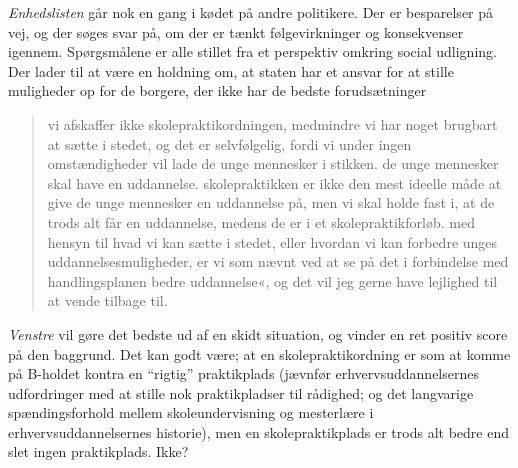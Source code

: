 \textit{Enhedslisten} går nok en gang i kødet på andre politikere.
Der er besparelser på vej, og der søges svar på, om der er tænkt følgevirkninger og konsekvenser igennem.
Spørgsmålene er alle stillet fra et perspektiv omkring social udligning.
Der lader til at være en holdning om, at staten har et ansvar for at stille muligheder op for de borgere, der ikke har de bedste forudsætninger

\begin{quotation}
vi afskaffer ikke skolepraktikordningen, medmindre vi har noget brugbart at sætte i stedet, og det er selvfølgelig, fordi vi under ingen omstændigheder vil lade de unge mennesker i stikken. de unge mennesker skal have en uddannelse. skolepraktikken er ikke den mest ideelle måde at give de unge mennesker en uddannelse på, men vi skal holde fast i, at de trods alt får en uddannelse, medens de er i et skolepraktikforløb. med hensyn til hvad vi kan sætte i stedet, eller hvordan vi kan forbedre unges uddannelsesmuligheder, er vi som nævnt ved at se på det i forbindelse med handlingsplanen bedre uddannelse«, og det vil jeg gerne have lejlighed til at vende tilbage til.
\end{quotation}

\textit{Venstre} vil gøre det bedste ud af en skidt situation, og vinder en ret positiv score på den baggrund.
Det kan godt være; at en skolepraktikordning er som at komme på B-holdet kontra en “rigtig” praktikplads (jævnfør erhvervsuddannelsernes udfordringer med at stille nok praktikpladser til rådighed; og det langvarige spændingsforhold mellem skoleundervisning og mesterlære i erhvervsuddannelsernes historie), men en skolepraktikplads er trods alt bedre end slet ingen praktikplads. Ikke?

